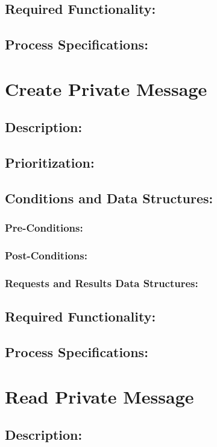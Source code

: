 \documentclass[a4paper,11pt]{article}
\begin{document}
\subsection{Required Functionality:} 
\subsection{Process Specifications:} 

\section{Create Private Message}
\subsection*{Description:}
\subsection{Prioritization:} 
\subsection{Conditions and Data Structures:}
\subsubsection*{Pre-Conditions:}
\subsubsection*{Post-Conditions:}
\subsubsection*{Requests and Results Data Structures:}
\subsection{Required Functionality:} 
\subsection{Process Specifications:} 

\section{Read Private Message}
\subsection*{Description:}
\end{document}
